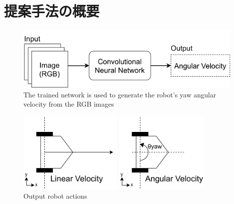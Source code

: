 
\section{提案手法の概要}

\begin{figure}[h]
  \centering
  \includegraphics[keepaspectratio, scale=0.60] {images/RobotGuidance_simple_system.png}
  \captionsetup{justification=raggedright} %
  \caption{The trained network is used to generate the robot's yaw angular velocity from the RGB images}
  \label{Fig:RobotGuidance_simple_system}
\end{figure}

\begin{figure}[h]
  \centering
  \begin{minipage}[c]{65mm} 
      \centering
      \includegraphics[height=40mm]{images/RobotGuidance_linear_velocity.png}
  \end{minipage}
  \begin{minipage}[c]{65mm} 
      \centering
      \includegraphics[height=40mm]{images/RobotGuidance_angular_velocity.png}
  \end{minipage}
  \caption{Output robot actions}
  \label{Fig:RobotGuidance_velocity}
\end{figure}

\newpage
